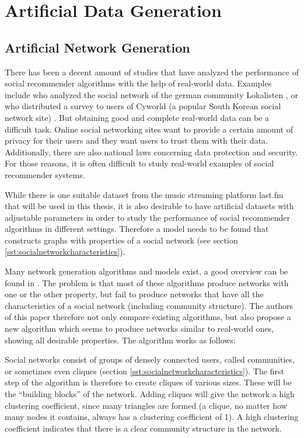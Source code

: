 \chapter{Artificial Data Generation}
\label{c:artificialdatageneration}
\section{Artificial Network Generation}
\label{st:artificialnetworkgeneration} There has been a decent amount of studies that have analyzed the performance of social recommender algorithms with the help of real-world data. Examples include \cite{Groh_2007} who analyzed the social network of the german community Lokalisten \cite{Lokalisten}, or \cite{Liu_2010} who distributed a survey to users of Cyworld (a popular South Korean social network site) \cite{Cyworld}. But obtaining good and complete real-world data can be a difficult task. Online social networking sites want to provide a certain amount of privacy for their users and they want users to trust them with their data. Additionally, there are also national laws concerning data protection and security. For those reasons, it is often difficult to study real-world examples of social recommender systems.

While there is one suitable dataset from the music streaming platform last.fm \cite{Lastfm} that will be used in this thesis, it is also desirable to have artificial datasets with adjustable parameters in order to study the performance of social recommender algorithms in different settings. Therefore a model needs to be found that constructs graphs with properties of a social network (see section \ref{sst:socialnetworkcharacteristics}).

Many network generation algorithms and models exist, a good overview can be found in \cite{Zaidi_2012}. The problem is that most of these algorithms produce networks with one or the other property, but fail to produce networks that have all the characteristics of a social network (including community structure). The authors of this paper therefore not only compare existing algorithms, but also propose a new algorithm which seems to produce networks similar to real-world ones, showing all desirable properties. The algorithm works as follows:

Social networks consist of groups of densely connected users, called communities, or sometimes even cliques (section \ref{sst:socialnetworkcharacteristics}). The first step of the algorithm is therefore to create cliques of various sizes. These will be the ``building blocks'' of the network. Adding cliques will give the network a high clustering coefficient, since many triangles are formed (a clique, no matter how many nodes it contains, always has a clustering coefficient of 1). A high clustering coefficient indicates that there is a clear community structure in the network.

